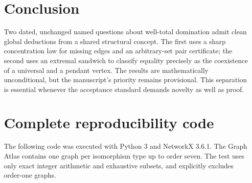 \documentclass[11pt,a4paper]{article}
\theoremstyle{definition}\newtheorem{definition}[theorem]{Definition}
\theoremstyle{remark}\newtheorem{remark}[theorem]{Remark}
\begin{document}
\section{Conclusion}
Two dated, unchanged named questions about well-total domination admit clean global deductions from a shared structural concept. The first uses a sharp concentration law for missing edges and an arbitrary-set pair certificate; the second uses an extremal sandwich to classify equality precisely as the coexistence of a universal and a pendant vertex. The results are mathematically unconditional, but the manuscript's priority remains provisional. This separation is essential whenever the acceptance standard demands novelty as well as proof.

\appendix
\section{Complete reproducibility code}\label{app:code}
The following code was executed with Python 3 and NetworkX 3.6.1. The Graph Atlas contains one graph per isomorphism type up to order seven. The test uses only exact integer arithmetic and exhaustive subsets, and explicitly excludes order-one graphs.
\end{document}

